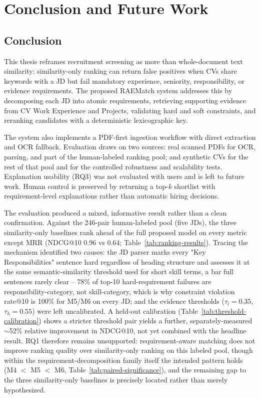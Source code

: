 \documentclass[12pt,a4paper,oneside]{report}
\newcommand{\systemname}{RAEMatch}
\begin{document}
\chapter{Conclusion and Future Work}

\section{Conclusion}
This thesis reframes recruitment screening as more than whole-document text similarity: similarity-only ranking can return false positives when CVs share keywords with a JD but fail mandatory experience, seniority, responsibility, or evidence requirements. The proposed \systemname{} system addresses this by decomposing each JD into atomic requirements, retrieving supporting evidence from CV Work Experience and Projects, validating hard and soft constraints, and reranking candidates with a deterministic lexicographic key.

The system also implements a PDF-first ingestion workflow with direct extraction and OCR fallback. Evaluation draws on two sources: real scanned PDFs for OCR, parsing, and part of the human-labeled ranking pool; and synthetic CVs for the rest of that pool and for the controlled robustness and scalability tests. Explanation usability (RQ3) was not evaluated with users and is left to future work. Human control is preserved by returning a top-$k$ shortlist with requirement-level explanations rather than automatic hiring decisions.

The evaluation produced a mixed, informative result rather than a clean confirmation. Against the 246-pair human-labeled pool (five JDs), the three similarity-only baselines rank ahead of the full proposed model on every metric except MRR (NDCG@10 0.96 vs 0.64; Table~\ref{tab:ranking-results}). Tracing the mechanism identified two causes: the JD parser marks every "Key Responsibilities" sentence hard regardless of heading structure and assesses it at the same semantic-similarity threshold used for short skill terms, a bar full sentences rarely clear -- 78\% of top-10 hard-requirement failures are responsibility-category, not skill-category, which is why constraint violation rate@10 is 100\% for M5/M6 on every JD; and the evidence thresholds ($\tau_l{=}0.35$, $\tau_h{=}0.55$) were left uncalibrated. A held-out calibration (Table~\ref{tab:threshold-calibration}) shows a stricter threshold pair yields a further, separately-measured $\sim$52\% relative improvement in NDCG@10, not yet combined with the headline result. RQ1 therefore remains unsupported: requirement-aware matching does not improve ranking quality over similarity-only ranking on this labeled pool, though within the requirement-decomposition family itself the intended pattern holds (M4 $<$ M5 $<$ M6, Table~\ref{tab:paired-significance}), and the remaining gap to the three similarity-only baselines is precisely located rather than merely hypothesized.
\end{document}
